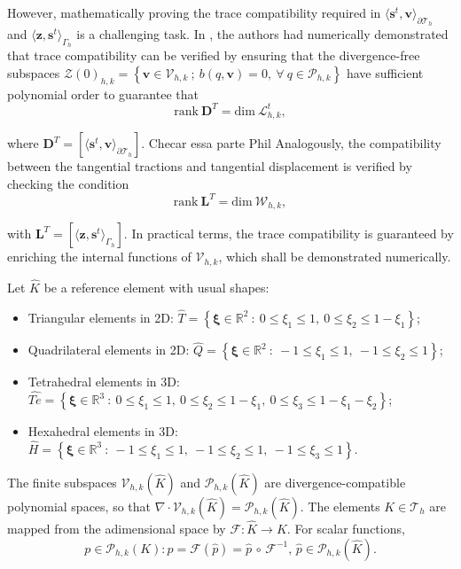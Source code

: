 \documentclass[english,11pt,3p,number,sort&compress]{elsarticle}
\newcommand{\giovane}{\color{red}{\bf\Large GA} \color{cyan} }
\begin{document}
However, mathematically proving the trace compatibility required in $\langle\bm{s}^t,\bm{v}\rangle_{\partial\mathcal{T}_h}$ and $\langle\bm{z},\bm{s}^t\rangle_{\Gamma_h}$ is a challenging task. In \cite{carvalho2024semi}, the authors had numerically demonstrated that trace compatibility can be verified by ensuring that the divergence-free subspaces $\mathcal{Z}(0)_{h,k}=\left\{ \bm{v} \in \mathcal{V}_{h,k} ~;~b(q,\bm{v})=0, ~\forall~q \in \mathcal{P}_{h,k} \right\}$ have sufficient polynomial order to guarantee that
\begin{equation*}
	\text{rank}~ \bm{D}^T = \text{dim} ~\mathcal{L}^t_{h,k},
\end{equation*}

\noindent where $\bm{D}^T=[\langle\bm{s}^t,\bm{v}\rangle_{\partial\mathcal{T}_h}]$. {\giovane Checar essa parte Phil }Analogously, the compatibility between the tangential tractions and tangential displacement is verified by checking the condition
\begin{equation*}
	\text{rank}~ \bm{L}^T = \text{dim} ~\mathcal{W}_{h,k},
\end{equation*}

\noindent with $\bm{L}^T=[\langle\bm{z},\bm{s}^t\rangle_{\Gamma_h}]$. In practical terms, the trace compatibility is guaranteed by enriching the internal functions of $\mathcal{V}_{h,k}$, which shall be demonstrated numerically.

Let $\hat{K}$ be a reference element with usual shapes:
\begin{itemize}
	\item Triangular elements in 2D: $\hat{T}= \left\{ \bm{\xi} \in \mathbb{R}^2 ~:~ 0 \leq \xi_1 \leq 1, ~0 \leq \xi_2 \leq 1-\xi_1 \right\}$;
	\item Quadrilateral elements in 2D: $\hat{Q}= \left\{ \bm{\xi} \in \mathbb{R}^2 ~:~ -1 \leq \xi_1 \leq 1, ~-1 \leq \xi_2 \leq 1 \right\}$;
	\item Tetrahedral elements in 3D: $\hat{Te}= \left\{ \bm{\xi} \in \mathbb{R}^3 ~:~ 0 \leq \xi_1 \leq 1, ~0 \leq \xi_2 \leq 1-\xi_1, ~0 \leq \xi_3 \leq 1-\xi_1-\xi_2 \right\}$;
	\item Hexahedral elements in 3D: $\hat{H}= \left\{ \bm{\xi} \in \mathbb{R}^3 ~:~ -1 \leq \xi_1 \leq 1, ~-1 \leq \xi_2 \leq 1, ~-1 \leq \xi_3 \leq 1 \right\}$.
\end{itemize}

The finite subspaces $\mathcal{V}_{h,k}(\hat{K})$ and $\mathcal{P}_{h,k}(\hat{K})$ are divergence-compatible polynomial spaces, so that $\nabla \cdot \mathcal{V}_{h,k}(\hat{K}) = \mathcal{P}_{h,k}(\hat{K})$. The elements $K \in \mathcal{T}_h$ are mapped from the adimensional space by $\mathcal{F}: \hat{K}\rightarrow K$. For scalar functions, 
\begin{equation*}p \in \mathcal{P}_{h,k}(K):p=\mathcal{F}(\hat{p}) = \hat{p}\,\circ\,\mathcal{F}^{-1}, \, \hat{p} \in \mathcal{P}_{h,k}(\hat{K}).	
\end{equation*}
\end{document}
